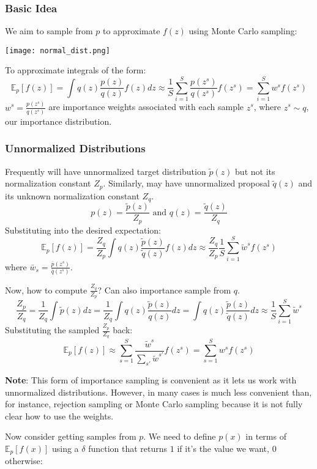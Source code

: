 \documentclass{article}
\begin{document}
\subsubsection{Basic Idea}
We aim to sample from $p$ to approximate $f(z)$ using Monte Carlo sampling:
\begin{center}
\texttt{[image: normal\_dist.png]}
\end{center}

To approximate integrals of the form:
\[ \mathbb{E}_p[f(z)] = \int q(z) \frac{p(z)}{q(z)}f(z)dz \approx \frac{1}{S} \sum_{i=1}^S\frac{p(z^s)}{q(z^s)}f(z^s) = \sum_{i=1}^Sw^sf(z^s)\]
$w^s = \frac{p(z^s)}{q(z^s)}$ are importance weights associated with each sample $z^s$, where $z^s \sim q$, our importance distribution.

\subsubsection{Unnormalized Distributions}
Frequently will have unnormalized target distribution $\tilde{p}(z)$ but not its normalization constant $Z_p$. Similarly, may have unnormalized proposal $\tilde{q}(z)$ and its unknown normalization constant $Z_q$.
\[p(z) = \frac{\tilde{p}(z)}{Z_p} \text{ and } q(z) = \frac{\tilde{q}(z)}{Z_q}\]
Substituting into the desired expectation:
\[ \mathbb{E}_p[f(z)] = \frac{Z_q}{Z_p} \int q(z) \frac{\tilde{p}(z)}{\tilde{q}(z)}f(z)dz \approx \frac{Z_q}{Z_p}\frac{1}{S} \sum_{i=1}^S \tilde{w}^sf(z^s)\]
where $\bar{w}_s = \frac{\bar{p}(z^s)}{\bar{q}(z^s)}$.

Now, how to compute $\frac{Z_q}{Z_p}$? Can also importance sample from $q$.
\[\frac{Z_p}{Z_q} = \frac{1}{Z_q}\int\tilde{p}(z)dz = \frac{1}{Z_q}\int q(z)\frac{\tilde{p}(z)}{q(z)}dz = \int q(z)\frac{\tilde{p}(z)}{\tilde{q}(z)}dz \approx \frac{1}{S}\sum_{i=1}^S\tilde{w}^s\]
Substituting the sampled $\frac{Z_p}{Z_q}$ back:
\[\mathbb{E}_p[f(z)] \approx \sum_{s=1}^S \frac{\tilde{w}^s}{\sum_{s'}\tilde{w}^{s'}}f(z^s) = \sum_{s=1}^S w^s f(z^s)\]

\textbf{Note}: This form of importance sampling is convenient as it lets us work with unnormalized distributions. However, in many cases is much less convenient than, for instance, rejection sampling or Monte Carlo sampling because it is not fully clear how to use the weights. 


Now consider getting samples from $p$. We need to define $p(x)$ in terms of $\mathbb{E}_p[f(x)]$ using a $\delta$ function that returns $1$ if it's the value we want, $0$ otherwise:
\end{document}
